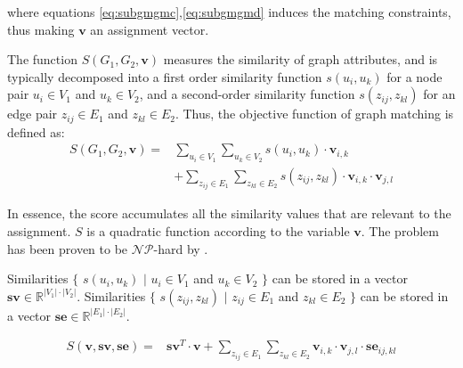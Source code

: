\documentclass[times,onecolumn,final,authoryear]{article}
\theoremstyle{definition}
\begin{document}
where equations \eqref{eq:subgmgmc},\eqref{eq:subgmgmd} induces the matching constraints, thus making $\mathbf{v}$ an assignment vector.

The function $S(G_1, G_2, \textbf{v})$ measures the similarity of graph attributes, and is typically decomposed into a first order similarity function $s(u_i, u_k)$ for a node pair $u_{i} \in V_1$ and $u_k \in V_2$, and a second-order similarity function $s(z_{ij}, z_{kl})$ for an edge pair $z_{ij} \in E_1$ and $z_{kl} \in E_2$. Thus, the objective function of graph matching is defined as: 
  \begin{equation}
  \label{eq:matchingfunction}
  \begin{aligned}
  S(G_1,G_2,\textbf{v}) =&	\sum_{u_i \in V_1}\sum_{u_k \in V_2} s(u_i, u_k)  \cdot \textbf{v}_{i,k} \\ 
  &+ \sum_{z_{ij} \in E_1}\sum_{z_{kl} \in E_2} s(z_{ij}, z_{kl}) \cdot  \textbf{v}_{i,k} \cdot \textbf{v}_{j,l}
    \end{aligned}
\end{equation}
 
In essence, the score accumulates all the similarity values that are relevant to the assignment. $S$ is a quadratic function according to the variable $\textbf{v}$. The problem has been proven to be $\mathcal{NP}$-hard by \cite{GMcomplexity}.

Similarities $\{$ $s(u_i, u_k)$ $\vert$ $u_{i} \in V_1$ and $u_k \in V_2$ $\}$ can be stored in a vector $\mathbf{sv}  \in \mathbb{R}^{|V_1| \cdot |V_2|}$. Similarities
 $\{$ $s(z_{ij}, z_{kl})$ $\vert$ $z_{ij} \in E_1$ and $z_{kl} \in E_2$ $\}$ can be stored in a vector $\mathbf{se}  \in \mathbb{R}^{|E_1| \cdot |E_2|}$.

\begin{equation}
  \label{eq:matchingfunctionquadvecto}
  \begin{aligned}
  S(\textbf{v},\mathbf{sv},\mathbf{se}) =& \mathbf{sv}^{T} \cdot \mathbf{v} + 
  \sum_{z_{ij} \in E_1}\sum_{z_{kl} \in E_2} \textbf{v}_{i,k} \cdot \textbf{v}_{j,l} \cdot \mathbf{se}_{ij,kl}
    \end{aligned}
\end{equation}
\end{document}
